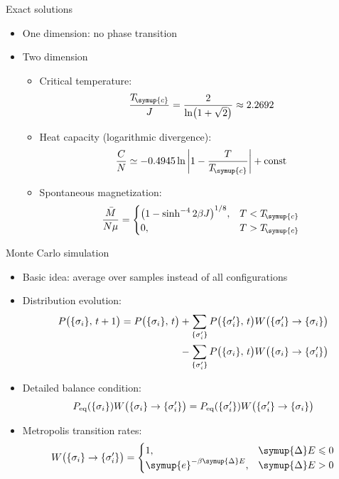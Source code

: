 \documentclass[aspectratio=169]{beamer}
\def\ee{{\symup{e}}}
\def\Tc{T_{\!\symup{c}}}
\def\incr{{\symup{\Delta}}}
\def\q#1{{\{#1\}}}
\def\const{\text{const}}
\begin{document}
\begin{frame}{Exact solutions}
\begin{itemize}
  \item One dimension: no phase transition
  \item Two dimension
    \begin{itemize}
      \item Critical temperature:
        \[ \frac{\Tc}{J} = \frac{2}{\ln(1+\sqrt{2})} \approx \num{2.2692} \]
      \item Heat capacity (logarithmic divergence):
        \[ \frac{C}{N} \simeq \num{-0.4945} \ln\abs{1-\frac{T}{\Tc}} + \const \]
      \item Spontaneous magnetization:
        \[
          \frac{\bar{M}}{N\mu} =
          \begin{cases}
            \qty(1 - \sinh^{-4} 2\beta J)^{1/8}, & T<\Tc \\
            0, & T>\Tc
          \end{cases}
        \]
    \end{itemize}
\end{itemize}
\end{frame}

\begin{frame}{Monte Carlo simulation}
\small
\begin{itemize}
  \item Basic idea: average over samples instead of all configurations
  \item Distribution evolution:
    \begin{align*}
      P\qty\big(\q{\sigma_i},\,t+1) = P\qty\big(\q{\sigma_i},\,t)
      &+ \sum_{\q{\sigma'_i}} P\qty\big(\q{\sigma'_i},\,t) W\qty\big(\q{\sigma'_i}\to\q{\sigma_i})
         \notag \\
      &- \sum_{\q{\sigma'_i}} P\qty\big(\q{\sigma_i},\,t)  W\qty\big(\q{\sigma_i}\to\q{\sigma'_i})
    \end{align*}
  \item Detailed balance condition:
    \[
        P_{\text{eq}}(\q{\sigma_i})  W\qty\big(\q{\sigma_i}\to\q{\sigma'_i})
      = P_{\text{eq}}(\q{\sigma'_i}) W\qty\big(\q{\sigma'_i}\to\q{\sigma_i})
    \]
  \item Metropolis transition rates:
    \[
      W\qty\big(\q{\sigma_i}\to\q{\sigma'_i}) =
      \begin{cases}
        1, & \incr{E} \leqslant 0 \\
        \ee^{-\beta \incr{E}}, & \incr{E} > 0
      \end{cases}
    \]
\end{itemize}
\end{frame}
\end{document}
